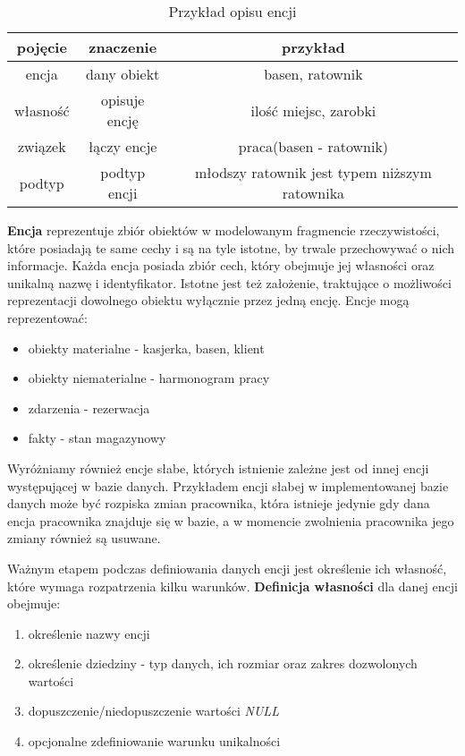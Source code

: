 \documentclass[a4paper]{article}
\begin{document}
\begin{table}[htbp]
\centering
\begin{tabular}{|c|c|c|}
\hline
\textbf{pojęcie} & \textbf{znaczenie} & \textbf{przykład}                             \\ \hline
encja            & dany obiekt        & basen, ratownik                               \\ \hline
własność         & opisuje encję      & ilość miejsc, zarobki                         \\ \hline
związek          & łączy encje        & praca(basen - ratownik)                       \\ \hline
podtyp           & podtyp encji       & młodszy ratownik jest typem niższym ratownika \\ \hline
\end{tabular}
\caption{Przykład opisu encji}
\end{table}

\textbf{Encja} reprezentuje  zbiór  obiektów  w  modelowanym  fragmencie  rzeczywistości, które posiadają te same cechy i są na tyle istotne, by trwale przechowywać o nich informacje. Każda encja posiada zbiór cech, który obejmuje jej własności oraz unikalną nazwę i identyfikator. Istotne jest też założenie, traktujące o możliwości reprezentacji dowolnego obiektu wyłącznie przez jedną encję. Encje mogą reprezentować:
\begin{itemize}
    \item obiekty materialne - kasjerka, basen, klient
    \item obiekty niematerialne - harmonogram pracy
    \item zdarzenia - rezerwacja
    \item fakty - stan magazynowy
\end{itemize}

Wyróżniamy również encje słabe, których istnienie zależne jest od innej encji występującej w bazie danych. Przykładem encji słabej w implementowanej bazie danych może być rozpiska zmian pracownika, która istnieje jedynie gdy dana encja pracownika znajduje się w bazie, a w momencie zwolnienia pracownika jego zmiany również są usuwane.

Ważnym etapem podczas definiowania danych encji jest określenie ich własność, które wymaga rozpatrzenia kilku warunków. \textbf{Definicja własności} dla danej encji obejmuje:
\begin{enumerate}
    \item określenie nazwy encji
    \item określenie dziedziny - typ danych, ich rozmiar oraz zakres dozwolonych wartości
    \item dopuszczenie/niedopuszczenie wartości \textit{NULL}
    \item opcjonalne zdefiniowanie warunku unikalności
\end{enumerate}
\end{document}
